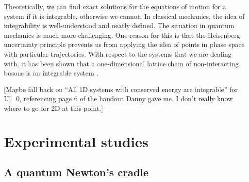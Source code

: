 \documentclass[a4paper, 10pt]{article}
\theoremstyle{plain}
\begin{document}
Theoretically, we can find exact solutions for the equations of motion for a
system if it is integrable, otherwise we cannot. In classical mechanics, the
idea of integrability is well-understood and neatly defined. The situation in
quantum mechanics is much more challenging. One reason for this is that
the Heisenberg uncertainty principle prevents us from applying the idea of
points in phase space with particular trajectories. With respect to the systems
that we are dealing with, it has been shown that a one-dimensional lattice
chain of non-interacting bosons is an integrable system \cite{Rigol2007}.

 [Maybe fall back on ``All 1D systems with conserved
energy are integrable'' for U!=0, referencing page 6 of the handout Danny gave
me. I don't really know where to go for 2D at this point.]


\section{Experimental studies}

\subsection{A quantum Newton's cradle}
\end{document}
